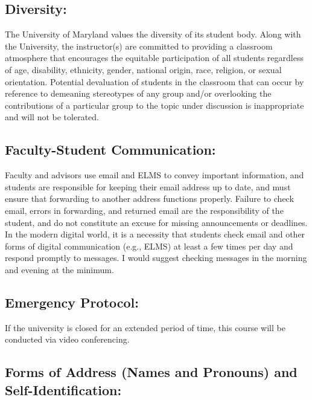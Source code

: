 \documentclass[
]{book}
\begin{document}
\hypertarget{diversity}{%
\subsection{Diversity:}\label{diversity}}

The University of Maryland values the diversity of its student body. Along with the University, the instructor(s) are committed to providing a classroom atmosphere that encourages the equitable participation of all students regardless of age, disability, ethnicity, gender, national origin, race, religion, or sexual orientation. Potential devaluation of students in the classroom that can occur by reference to demeaning stereotypes of any group and/or overlooking the contributions of a particular group to the topic under discussion is inappropriate and will not be tolerated.

\hypertarget{faculty-student-communication-1}{%
\subsection{Faculty-Student Communication:}\label{faculty-student-communication-1}}

Faculty and advisors use email and ELMS to convey important information, and students are responsible for keeping their email address up to date, and must ensure that forwarding to another address functions properly. Failure to check email, errors in forwarding, and returned email are the responsibility of the student, and do not constitute an excuse for missing announcements or deadlines. In the modern digital world, it is a necessity that students check email and other forms of digital communication (e.g., ELMS) at least a few times per day and respond promptly to messages. I would suggest checking messages in the morning and evening at the minimum.

\hypertarget{emergency-protocol-1}{%
\subsection{Emergency Protocol:}\label{emergency-protocol-1}}

If the university is closed for an extended period of time, this course will be conducted via video conferencing.

\hypertarget{forms-of-address-names-and-pronouns-and-self-identification}{%
\subsection{Forms of Address (Names and Pronouns) and Self-Identification:}\label{forms-of-address-names-and-pronouns-and-self-identification}}
\end{document}
